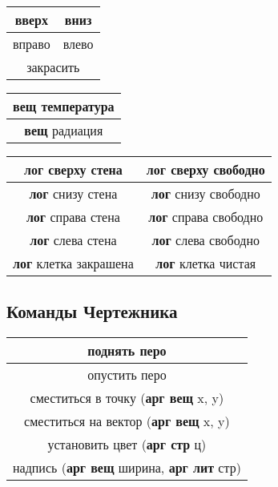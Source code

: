 \documentclass[12pt,a4paper]{article}
\begin{document}
\begin{center}
\begin{tabular}{||c|c||}
\hline
\hline
вверх &  вниз\\
\hline
вправо &  влево\\
\hline
\multicolumn{2}{||c||}{закрасить}\\
\hline
\hline
\end{tabular}
\begin{tabular}{||c||}
\hline
\hline
\textbf{вещ} температура\\
\hline
\textbf{вещ} радиация\\
\hline
\hline
\end{tabular}

\vspace{1ex}

\begin{tabular}{||c|c||}
\hline
\hline
\textbf{лог} сверху стена & \textbf{лог} сверху свободно\\
\hline
\textbf{лог} снизу стена & \textbf{лог} снизу свободно\\
\hline
\textbf{лог} справа стена & \textbf{лог} справа свободно\\
\hline
\textbf{лог} слева стена & \textbf{лог} слева свободно\\
\hline
\textbf{лог} клетка закрашена & \textbf{лог} клетка чистая\\
\hline
\hline
\end{tabular}
\end{center}

\subsection{Команды Чертежника}

\begin{center}
\begin{tabular}{||c||}
\hline
\hline
поднять перо\\
\hline
  опустить перо\\
\hline
  сместиться в точку (\textbf{арг вещ} x, y)\\
\hline
  сместиться на вектор (\textbf{арг вещ} x, y)\\
\hline
  установить цвет (\textbf{арг стр} ц)\\
\hline
  надпись (\textbf{арг вещ} ширина, \textbf{арг лит} стр)\\
\hline
\hline
\end{tabular}
\end{center}
\end{document}
